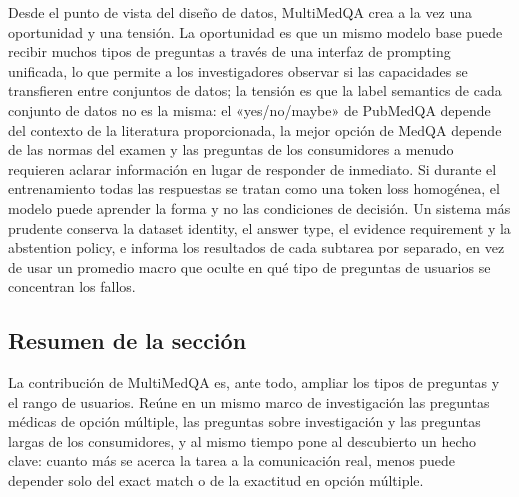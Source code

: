 Desde el punto de vista del diseño de datos, MultiMedQA crea a la vez una oportunidad y una tensión. La oportunidad es que un mismo modelo base puede recibir muchos tipos de preguntas a través de una interfaz de prompting unificada, lo que permite a los investigadores observar si las capacidades se transfieren entre conjuntos de datos; la tensión es que la label semantics de cada conjunto de datos no es la misma: el «yes/no/maybe» de PubMedQA depende del contexto de la literatura proporcionada, la mejor opción de MedQA depende de las normas del examen y las preguntas de los consumidores a menudo requieren aclarar información en lugar de responder de inmediato. Si durante el entrenamiento todas las respuestas se tratan como una token loss homogénea, el modelo puede aprender la forma y no las condiciones de decisión. Un sistema más prudente conserva la dataset identity, el answer type, el evidence requirement y la abstention policy, e informa los resultados de cada subtarea por separado, en vez de usar un promedio macro que oculte en qué tipo de preguntas de usuarios se concentran los fallos.


\subsection{Resumen de la sección}

La contribución de MultiMedQA es, ante todo, ampliar los tipos de preguntas y el rango de usuarios. Reúne en un mismo marco de investigación las preguntas médicas de opción múltiple, las preguntas sobre investigación y las preguntas largas de los consumidores, y al mismo tiempo pone al descubierto un hecho clave: cuanto más se acerca la tarea a la comunicación real, menos puede depender solo del exact match o de la exactitud en opción múltiple.
